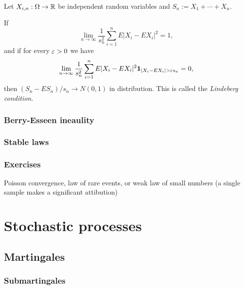 \documentclass{../note}
\begin{document}
\begin{prb}
Let $X_{i,n}:\Omega\to\mathbb{R}$ be independent random variables and $S_n:=X_1+\cdots+X_n$.
\begin{parts}
\item
If
\[\lim_{n\to\infty}\frac1{s_n^2}\sum_{i=1}^nE|X_i-EX_i|^2=1,\]
and if for every $\varepsilon>0$ we have
\[\lim_{n\to\infty}\frac1{s_n^2}\sum_{i=1}^nE|X_i-EX_i|^2\1_{|X_i-EX_i|>\e s_n}=0,\]
then $(S_n-ES_n)/s_n\to N(0,1)$ in distribution.
This is called the \emph{Lindeberg condition}.
\end{parts}
\end{prb}


\section{Berry-Esseen ineaulity}



\section{Stable laws}


\section*{Exercises}

Poisson convergence, law of rare events, or weak law of small numbers (a single sample makes a significant attibution)



\chapter{}












\part{Stochastic processes}
\chapter{Martingales}
\section{Submartingales}
\end{document}
